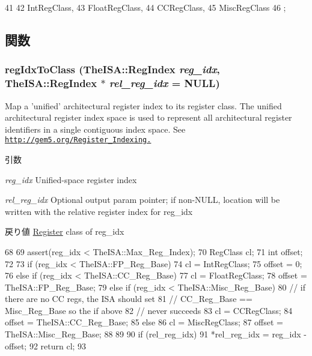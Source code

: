 \begin{DoxyCode}
41               {
42     IntRegClass,        
43     FloatRegClass,      
44     CCRegClass,         
45     MiscRegClass        
46 };
\end{DoxyCode}


\subsection{関数}
\hypertarget{reg__class_8hh_a275a232e420c9ac198b7f942c885ecf8}{
\subsubsection[{regIdxToClass}]{ regIdxToClass (TheISA::RegIndex {\em reg\_\-idx}, \/  TheISA::RegIndex $\ast$ {\em rel\_\-reg\_\-idx} = {\ttfamily NULL})}}
\label{reg__class_8hh_a275a232e420c9ac198b7f942c885ecf8}
Map a 'unified' architectural register index to its register class. The unified architectural register index space is used to represent all architectural register identifiers in a single contiguous index space. See \href{http://gem5.org/Register_Indexing.}{\tt http://gem5.org/Register\_\-Indexing.}


\begin{DoxyParams}{引数}
\item[{\em reg\_\-idx}]Unified-\/space register index \item[{\em rel\_\-reg\_\-idx}]Optional output param pointer; if non-\/NULL, location will be written with the relative register index for reg\_\-idx\end{DoxyParams}
\begin{DoxyReturn}{戻り値}
\hyperlink{classRegister}{Register} class of reg\_\-idx 
\end{DoxyReturn}



\begin{DoxyCode}
68 {
69     assert(reg_idx < TheISA::Max_Reg_Index);
70     RegClass cl;
71     int offset;
72 
73     if (reg_idx < TheISA::FP_Reg_Base) {
74         cl = IntRegClass;
75         offset = 0;
76     } else if (reg_idx < TheISA::CC_Reg_Base) {
77         cl = FloatRegClass;
78         offset = TheISA::FP_Reg_Base;
79     } else if (reg_idx < TheISA::Misc_Reg_Base) {
80         // if there are no CC regs, the ISA should set
81         // CC_Reg_Base == Misc_Reg_Base so the if above
82         // never succeeds
83         cl = CCRegClass;
84         offset = TheISA::CC_Reg_Base;
85     } else {
86         cl = MiscRegClass;
87         offset = TheISA::Misc_Reg_Base;
88     }
89 
90     if (rel_reg_idx)
91         *rel_reg_idx = reg_idx - offset;
92     return cl;
93 }
\end{DoxyCode}


